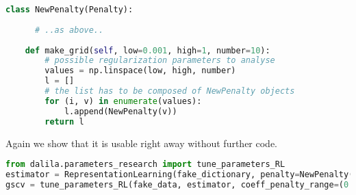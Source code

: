 \begin{lstlisting}[language=Python]
class NewPenalty(Penalty):
   
	  # ..as above..
        
    def make_grid(self, low=0.001, high=1, number=10):
		# possible regularization parameters to analyse        
        values = np.linspace(low, high, number)
        l = []
        # the list has to be composed of NewPenalty objects
        for (i, v) in enumerate(values):
            l.append(NewPenalty(v))
        return l
\end{lstlisting}
Again we show that it is usable right away without further code.
\begin{lstlisting}[language=Python]
from dalila.parameters_research import tune_parameters_RL
estimator = RepresentationLearning(fake_dictionary, penalty=NewPenalty(5))
gscv = tune_parameters_RL(fake_data, estimator, coeff_penalty_range=(0.1, 1, 3))
\end{lstlisting}
